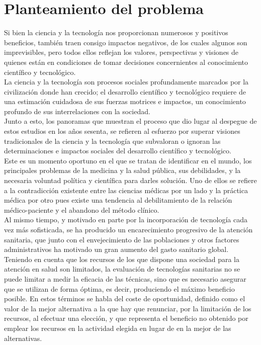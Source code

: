 \documentclass [a4paper, 12pt]{report}
\begin{document}
\section{Planteamiento del problema}

Si bien la ciencia y la tecnología nos proporcionan numerosos y positivos beneficios, también traen consigo impactos negativos, de los cuales algunos son imprevisibles, pero todos ellos reflejan los valores, perspectivas y visiones de quienes están en condiciones de tomar decisiones concernientes al conocimiento científico y tecnológico.\\
La ciencia y la tecnología son procesos sociales profundamente marcados por la civilización donde han crecido; el desarrollo científico y tecnológico requiere de una estimación cuidadosa de sus fuerzas motrices e impactos, un conocimiento profundo de sus interrelaciones con la sociedad.\\
Junto a esto, los panoramas que muestran el proceso que dio lugar al despegue de estos estudios en los años sesenta, se refieren al esfuerzo por superar visiones tradicionales de la ciencia y la tecnología que subvaloran o ignoran las determinaciones e impactos sociales del desarrollo científico y tecnológico.\\
Este es un momento oportuno en el que se tratan de identificar en el mundo, los principales problemas de la medicina y la salud pública, sus debilidades, y la necesaria voluntad política y científica para darles solución. Uno de ellos se refiere a la contradicción existente entre las ciencias médicas por un lado y la práctica médica por otro pues existe una tendencia al debilitamiento de la relación médico-paciente y el abandono del método clínico.\\
Al mismo tiempo, y motivado en parte por la incorporación de tecnología cada vez más sofisticada, se ha producido un encarecimiento progresivo de la atención sanitaria, que junto con el envejecimiento de las poblaciones y otros factores administrativos ha
motivado un gran aumento del gasto sanitario global. \\
Teniendo en cuenta que los recursos de los que dispone una sociedad para la atención en salud son limitados, la evaluación de tecnologías sanitarias no se puede limitar a medir la eficacia de las técnicas, sino que es necesario asegurar que se utilizan de forma óptima, es decir, produciendo el máximo beneficio posible. En estos términos se habla del coste de oportunidad, definido como el valor de la mejor alternativa a la que hay que renunciar, por la limitación de los recursos, al efectuar una elección, y que representa el beneficio no obtenido por emplear los recursos en la actividad elegida en lugar de en la mejor de las alternativas.\\
\end{document}
